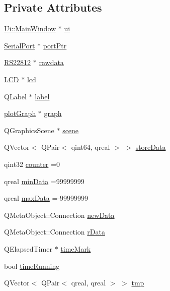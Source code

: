 \subsection*{Private Attributes}
\begin{DoxyCompactItemize}
\item 
\hyperlink{class_ui_1_1_main_window}{Ui\-::\-Main\-Window} $\ast$ \hyperlink{class_main_window_a35466a70ed47252a0191168126a352a5}{ui}
\item 
\hyperlink{class_serial_port}{Serial\-Port} $\ast$ \hyperlink{class_main_window_ae00babad562899a2cd108ff3ee684990}{port\-Ptr}
\item 
\hyperlink{class_r_s22812}{R\-S22812} $\ast$ \hyperlink{class_main_window_a478554a221305a416f331e9df2569749}{rawdata}
\item 
\hyperlink{class_l_c_d}{L\-C\-D} $\ast$ \hyperlink{class_main_window_a62606e151c6477b9ed1287b792ef2643}{lcd}
\item 
Q\-Label $\ast$ \hyperlink{class_main_window_a89e281849b9cf7d03662402c6bc6012c}{label}
\item 
\hyperlink{classplot_graph}{plot\-Graph} $\ast$ \hyperlink{class_main_window_ac28b469bbf190a49e26ebfb3ff3c8d22}{graph}
\item 
Q\-Graphics\-Scene $\ast$ \hyperlink{class_main_window_a51ac2b126495216832501cea3929c6f6}{scene}
\item 
Q\-Vector$<$ Q\-Pair$<$ qint64, qreal $>$ $>$ \hyperlink{class_main_window_a2759b4057b444152680d6c8ec05a6cac}{store\-Data}
\item 
qint32 \hyperlink{class_main_window_a414ed704b853734bdbde7f0e8e333b20}{counter} =0
\item 
qreal \hyperlink{class_main_window_a02535ba8418420aee9068241aa3e744c}{min\-Data} =99999999
\item 
qreal \hyperlink{class_main_window_a6e7a55c985b905d20ae02cfe0f64d2f2}{max\-Data} =-\/99999999
\item 
Q\-Meta\-Object\-::\-Connection \hyperlink{class_main_window_acff37cb14f3ab80806cc993856632401}{new\-Data}
\item 
Q\-Meta\-Object\-::\-Connection \hyperlink{class_main_window_aa252eef60aa6c3f81a20533a0fe73a2e}{r\-Data}
\item 
Q\-Elapsed\-Timer $\ast$ \hyperlink{class_main_window_a8ce9e134300261f607e1f488a9ef8a1d}{time\-Mark}
\item 
bool \hyperlink{class_main_window_ac5db45f96085abb0a0ac25e981e8d1df}{time\-Running}
\item 
Q\-Vector$<$ Q\-Pair$<$ qreal, qreal $>$ $>$ \hyperlink{class_main_window_a4daf46ba6fc596693c66c97db90cc700}{tmp}
\end{DoxyCompactItemize}


